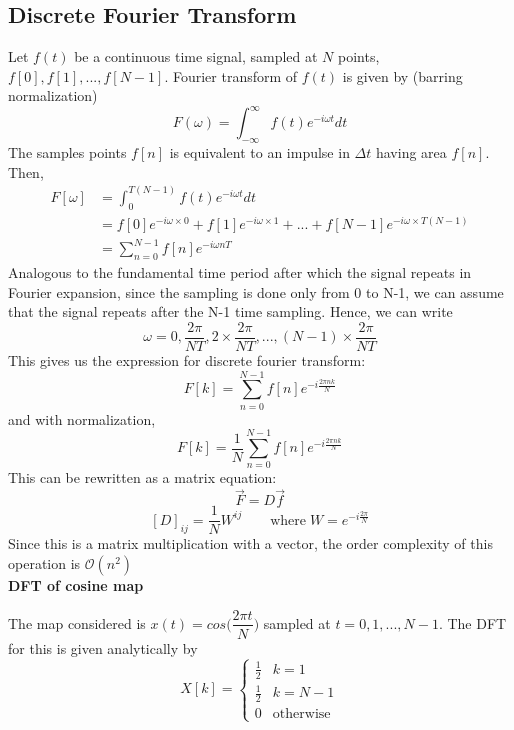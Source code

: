 \documentclass[11pt]{article}
\begin{document}
   		\subsection{Discrete Fourier Transform}
   			Let $f(t)$ be a continuous time signal, sampled at $N$ points, $f[0],f[1],...,f[N-1]$. Fourier transform of $f(t)$ is given by (barring normalization)
   			$$
   				F(\omega)=\int_{-\infty}^\infty f(t) e^{-i \omega t} dt
   			$$
   			The samples points $f[n]$ is equivalent to an impulse in $\Delta t$ having area $f[n]$. Then,
   			\begin{align*}
   				F[\omega] &= \int_0^{T (N-1)} f(t) e^{- i \omega t}dt  \\
   				&= f[0] e^{-i \omega \times 0} + f[1] e^{-i \omega \times 1} +...+ f[N-1] e^{-i \omega \times T(N-1)} \\
   				&= \sum_{n=0}^{N-1} f[n] e^{- i \omega n T}
   			\end{align*}
   			Analogous to the fundamental time period after which the signal repeats in Fourier expansion, since the sampling is done only from 0 to N-1, we can assume that the signal repeats after the N-1 time sampling. Hence, we can write
   			$$
   				\omega = 0, \frac{2\pi}{N T},2 \times \frac{2\pi}{N T},...,(N-1) \times \frac{2\pi}{N T}
   			$$
   			This gives us the expression for discrete fourier transform:
   			$$
   				F[k] = \sum_{n=0}^{N-1} f[n] e^{-i\frac{ 2\pi n k }{N}}
   			$$
   			and with normalization, 
   			$$
   				F[k] = \frac{1}{N}\sum_{n=0}^{N-1} f[n] e^{-i\frac{ 2\pi n k }{N}}
   			$$
   			This can be rewritten as a matrix equation:
   			$$
   				\vec F = D \vec f
   			$$
   			$$
   				[D]_{ij} = \frac{1}{N} W^{ij} \qquad \textrm{where} \; W = e^{-i\frac{2\pi}{N}}
   			$$
   			Since this is a matrix multiplication with a vector, the order complexity of this operation is $\mathcal{O} (n^2)$ \\[10mm]
            \textbf{DFT of cosine map}

            The map considered is $x(t) = cos\Big(\dfrac{2 \pi t}{N}\Big)$ sampled at $t=0,1,...,N-1$. The DFT for this is given analytically by 
            $$
               X[k] = 
               \begin{cases} 
                  \frac{1}{2} & k = 1\\
                  \frac{1}{2} & k = N-1\\
                  0 &\textrm{otherwise}
                  \end{cases}
            $$
\end{document}
